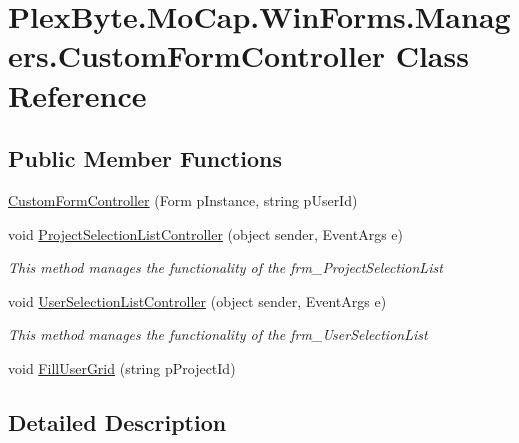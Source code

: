 \hypertarget{class_plex_byte_1_1_mo_cap_1_1_win_forms_1_1_managers_1_1_custom_form_controller}{}\section{Plex\+Byte.\+Mo\+Cap.\+Win\+Forms.\+Managers.\+Custom\+Form\+Controller Class Reference}
\label{class_plex_byte_1_1_mo_cap_1_1_win_forms_1_1_managers_1_1_custom_form_controller}
\subsection*{Public Member Functions}
\begin{DoxyCompactItemize}
\item 
\hyperlink{class_plex_byte_1_1_mo_cap_1_1_win_forms_1_1_managers_1_1_custom_form_controller_af9823a8a0693df844c272ef1614be672}{Custom\+Form\+Controller} (Form p\+Instance, string p\+User\+Id)
\item 
void \hyperlink{class_plex_byte_1_1_mo_cap_1_1_win_forms_1_1_managers_1_1_custom_form_controller_a9ccd460bf2d87520325cbdfdfaafd082}{Project\+Selection\+List\+Controller} (object sender, Event\+Args e)
\begin{DoxyCompactList}\small\item\em This method manages the functionality of the frm\+\_\+\+Project\+Selection\+List \end{DoxyCompactList}\item 
void \hyperlink{class_plex_byte_1_1_mo_cap_1_1_win_forms_1_1_managers_1_1_custom_form_controller_af5527ddcd420f63b767e6410450f3296}{User\+Selection\+List\+Controller} (object sender, Event\+Args e)
\begin{DoxyCompactList}\small\item\em This method manages the functionality of the frm\+\_\+\+User\+Selection\+List \end{DoxyCompactList}\item 
void \hyperlink{class_plex_byte_1_1_mo_cap_1_1_win_forms_1_1_managers_1_1_custom_form_controller_a519591857d07cae2aa2ae1782ca516d3}{Fill\+User\+Grid} (string p\+Project\+Id)
\end{DoxyCompactItemize}


\subsection{Detailed Description}


